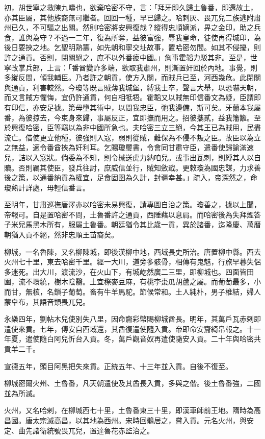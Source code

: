 \begin{pinyinscope}
初，胡世寧之救陳九疇也，欲棄哈密不守，言：「拜牙即久歸土魯番，即還故土，亦其臣屬，其他族裔無可繼者。回回一種，早已歸之。哈剌灰、畏兀兒二族逃附肅州已久，不可驅之出關。然則哈密將安興復哉？縱得忠順嫡派，畀之金印，助之兵食，誰與為守？不過一二年，復為所奪，益彼富強，辱我皇命，徒使再得城印，為後日要挾之地。乞聖明熟籌，如先朝和寧交址故事，置哈密勿間。如其不侵擾，則許之通貢。否則，閉關絕之，庶不以外番疲中國。」詹事霍韜力駁其非。至是，世寧改掌兵部，上言：「番酋變詐多端，欲取我肅州，則漸置奸回於內地。事覺，則多縱反間，傾我輔臣。乃者許之朝貢，使方入關，而賊兵已至，河西幾危。此閉關與通貢，利害較然。今瓊等既言賊薄我城堡，縛我士卒，聲言大舉，以恐嚇天朝，而又言賊方懼悔，宜仍許通貢，何自相牴牾。霍韜又以賊無印信番文為疑，臣謂即有印信，亦安足據。第毋墮其術中，以間我忠臣，弛我邊備，斯可矣。牙蘭本我屬番，為彼掠去，今束身來歸，事屬反正，宜即撫而用之。招彼攜貳，益我籓籬。至於興復哈密，臣等竊以為非中國所急也。夫哈密三立三絕，今其王已為賊用，民盡流亡。借使更立他種，彼強則入寇，弱則從賊，難保為不侵不叛之臣。故臣以為立之無益，適令番酋挾為奸利耳。乞賜瓊璽書，令會同甘肅守臣，遣番使歸諭滿速兒，詰以入寇狀。倘委為不知，則令械送虎力納咱兒。或事出瓦剌，則縛其人以自贖。否則羈其使臣，發兵往討，庶威信並行，賊知斂戢。更敕瓊為國忠謀，力求善後之策，以通番納貢為權宜，足食固圉為久計，封疆幸甚。」疏入，帝深然之，命瓊熟計詳處，毋輕信番言。

至明年，甘肅巡撫唐澤亦以哈密未易興復，請專圖自治之策。瓊善之，據以上聞，帝報可。自是置哈密不問，土魯番許之通貢，西陲藉以息肩。而哈密後為失拜煙答子米兒馬黑木所有，服屬土魯番。朝廷猶令其比歲一貢，異於諸番，迄隆慶、萬曆朝猶入貢不絕，然非忠順王苗裔矣。

柳城，一名魯陳，又名柳陳城，即後漢柳中地，西域長史所治。唐置柳中縣。西去火州七十里，東去哈密千里。經一大川，道旁多骸骨，相傳有鬼魅，行旅早暮失侶多迷死。出大川，渡流沙，在火山下，有城屹然廣二三里，即柳城也。四面皆田園，流不環繞，樹木陰翳。土宜穄麥豆麻，有桃李棗瓜胡蘆之屬。而葡萄最多，小而甘，無核，名鎖子葡萄。畜有牛羊馬駝。節候常和。土人純朴，男子椎結，婦人蒙皁布，其語音類畏兀兒。

永樂四年，劉帖木兒使別失八里，因命齎彩幣賜柳城酋長。明年，其萬戶瓦赤剌即遣使來貢。七年，傅安自西域還，其酋復遣使隨入貢。帝即命安齎綺帛報之。十一年夏，遣使隨白阿兒忻台入貢。冬，萬戶觀音奴再遣使隨安入貢。二十年與哈密共貢羊二千。

宣德五年，頭目阿黑把失來貢。正統五年、十三年並入貢。自後不復至。

柳城密爾火州、土魯番，凡天朝遣使及其酋長入貢，多與之偕。後土魯番強，二國並為所滅。

火州，又名哈剌，在柳城西七十里，土魯番東三十里，即漢車師前王地。隋時為高昌國。唐太宗滅高昌，以其地為西州。宋時回鶻居之，嘗入貢。元名火州，與安定、曲先諸衛統號畏兀兒，置達魯花赤監治之。


\end{pinyinscope}
